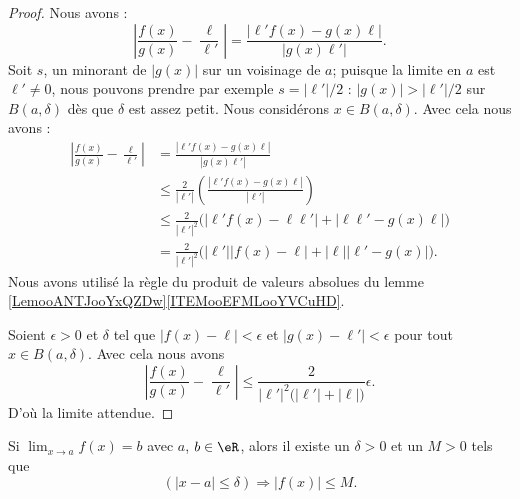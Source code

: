 \begin{proof}
	Nous avons :
	\begin{equation}
		\left| \frac{ f(x) }{ g(x) }-\frac{ \ell }{ \ell' } \right| =\frac{ | \ell'f(x)-g(x)\ell | }{ |g(x)\ell'| }.
	\end{equation}
	Soit \( s\), un minorant de \( | g(x) |\) sur un voisinage de \( a\); puisque la limite en \( a\) est \( \ell'\neq 0\), nous pouvons prendre par exemple \( s=|\ell'|/2\) : \( | g(x) |>|\ell'|/2\) sur \( B(a,\delta)\) dès que \( \delta\) est assez petit. Nous considérons \( x\in B(a,\delta)\). Avec cela nous avons :
	\begin{subequations}
		\begin{align}
			\left| \frac{ f(x) }{ g(x) }-\frac{ \ell }{ \ell' } \right| & =\frac{ | \ell'f(x)-g(x)\ell | }{ |g(x)\ell'| }                                                 \\
			                                                            & \leq \frac{ 2 }{ | \ell' |} \left( \frac{ | \ell'f(x)-g(x)\ell | }{ | \ell' | } \right)         \\
			                                                            & \leq \frac{ 2 }{ | \ell' |^2 }\big( | \ell'f(x)-\ell\ell' |+| \ell\ell'-g(x)\ell | \big)        \\
			                                                            & =\frac{ 2 }{ | \ell' |^2 }\big( | \ell' | |f(x)-\ell |+| \ell | |\ell'-g(x) | \big).
		\end{align}
	\end{subequations}
    Nous avons utilisé la règle du produit de valeurs absolues du lemme \ref{LemooANTJooYxQZDw}\ref{ITEMooEFMLooYVCuHD}.

	Soient \( \epsilon>0\) et \( \delta\) tel que \( | f(x)-\ell |<\epsilon\) et \( | g(x)-\ell' |<\epsilon\) pour tout \( x\in B(a,\delta)\). Avec cela nous avons
	\begin{equation}
		\left| \frac{ f(x) }{ g(x) }-\frac{ \ell }{ \ell' } \right| \leq\frac{ 2 }{ | \ell' |^2\big( | \ell' |+| \ell | \big) }\epsilon.
	\end{equation}
	D'où la limite attendue.
\end{proof}

\begin{lemma}       \label{LemLimMajorableVois}
	Si \( \lim_{x\to a}f(x)=b\) avec \( a\), \( b\in\eR\), alors il existe un \( \delta>0\) et un \( M>0\) tels que
	\[
		(| x-a |\leq\delta)\Rightarrow | f(x) |\leq M.
	\]
\end{lemma}

